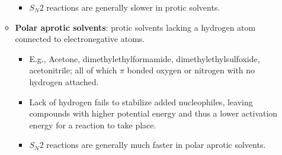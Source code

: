 \documentclass[12pt,a4paper]{article}
\begin{document}
\begin{itemize}
\begin{itemize}
\begin{itemize}
                \item \(S_N2\) reactions are generally {\color{o-Sun}slower in protic solvents}.
            \end{itemize}
        \item \textbf{Polar aprotic solvents}: protic solvents lacking a hydrogen atom connected to electronegative atoms.
            \begin{itemize}
                \item E.g., Acetone, dimethylethylformamide, dimethylethylsulfoxide, acetonitrile; all of which $\pi$ bonded oxygen or nitrogen with no hydrogen attached.
                \item Lack of hydrogen {\color{o-Sun}fails to stabilize added nucleophiles}, leaving compounds with higher potential energy and thus a {\color{o-Sun}lower activation energy} for a reaction to take place.
                \item \(S_N2\) reactions are generally much {\color{o-Sun}faster in polar aprotic solvents}.
            \end{itemize}
    \end{itemize}
\end{itemize}
\end{document}
